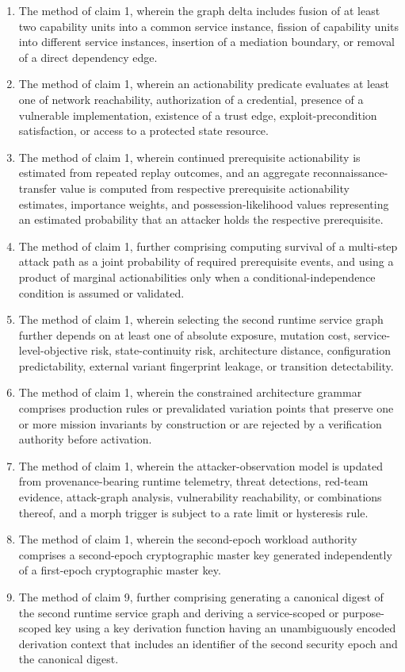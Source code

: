 \documentclass[11pt,letterpaper]{article}
\begin{document}
\begin{enumerate}[leftmargin=2em,itemsep=3pt,label=\arabic*.]
\item The method of claim 1, wherein the graph delta includes fusion of at least two capability units into a common service instance, fission of capability units into different service instances, insertion of a mediation boundary, or removal of a direct dependency edge.
\item The method of claim 1, wherein an actionability predicate evaluates at least one of network reachability, authorization of a credential, presence of a vulnerable implementation, existence of a trust edge, exploit-precondition satisfaction, or access to a protected state resource.
\item The method of claim 1, wherein continued prerequisite actionability is estimated from repeated replay outcomes, and an aggregate reconnaissance-transfer value is computed from respective prerequisite actionability estimates, importance weights, and possession-likelihood values representing an estimated probability that an attacker holds the respective prerequisite.
\item The method of claim 1, further comprising computing survival of a multi-step attack path as a joint probability of required prerequisite events, and using a product of marginal actionabilities only when a conditional-independence condition is assumed or validated.
\item The method of claim 1, wherein selecting the second runtime service graph further depends on at least one of absolute exposure, mutation cost, service-level-objective risk, state-continuity risk, architecture distance, configuration predictability, external variant fingerprint leakage, or transition detectability.
\item The method of claim 1, wherein the constrained architecture grammar comprises production rules or prevalidated variation points that preserve one or more mission invariants by construction or are rejected by a verification authority before activation.
\item The method of claim 1, wherein the attacker-observation model is updated from provenance-bearing runtime telemetry, threat detections, red-team evidence, attack-graph analysis, vulnerability reachability, or combinations thereof, and a morph trigger is subject to a rate limit or hysteresis rule.
\item The method of claim 1, wherein the second-epoch workload authority comprises a second-epoch cryptographic master key generated independently of a first-epoch cryptographic master key.
\item The method of claim 9, further comprising generating a canonical digest of the second runtime service graph and deriving a service-scoped or purpose-scoped key using a key derivation function having an unambiguously encoded derivation context that includes an identifier of the second security epoch and the canonical digest.

\end{enumerate}
\end{document}
